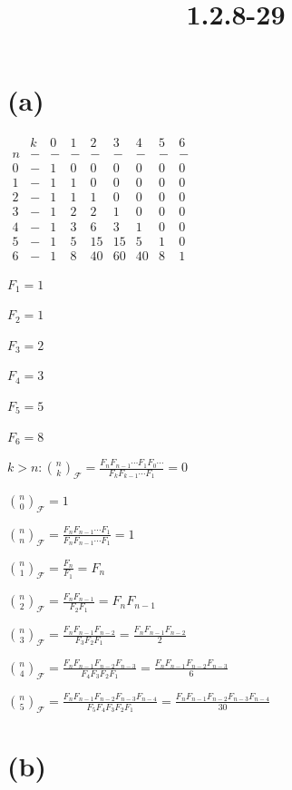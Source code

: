 \documentclass{article}
\title{1.2.8-29}
\begin{document}
\maketitle

\section*{(a)}

$\begin{matrix} & k & 0 & 1 & 2 & 3 & 4 & 5 & 6 \\ n & - & - & - & - & - & - & - & - \\ 0 & - & 1 & 0 & 0 & 0 & 0 & 0 & 0 \\ 1 & - & 1 & 1 & 0 & 0 & 0 & 0 & 0 \\ 2 & - & 1 & 1 & 1& 0 & 0 & 0 & 0 \\3 & - & 1 & 2 & 2 & 1 & 0 & 0 & 0 \\4 & - & 1 & 3 & 6 & 3 & 1 & 0 & 0 \\ 5 & - & 1 & 5 & 15 & 15 & 5 & 1 & 0 \\ 6 & - & 1 & 8 & 40 & 60 & 40 & 8 & 1 \end{matrix}$

$F_1 = 1$

$F_2 = 1$

$F_3 = 2$

$F_4 = 3$

$F_5 = 5$

$F_6 = 8$

$k > n: \binom{n}{k}_{\mathcal{F}} = \frac{F_nF_{n-1}\cdots F_1F_0\cdots}{F_kF_{k-1}\cdots F_1} = 0$

$\binom{n}{0}_{\mathcal{F}} = 1$

$\binom{n}{n}_{\mathcal{F}} = \frac{F_n F_{n-1} \cdots F_1}{F_n F_{n-1} \cdots F_1} = 1$

$\binom{n}{1}_{\mathcal{F}} = \frac{F_n}{F_1} = F_n$

$\binom{n}{2}_{\mathcal{F}} = \frac{F_nF_{n-1}}{F_2F_1} = F_nF_{n-1}$

$\binom{n}{3}_{\mathcal{F}} = \frac{F_nF_{n-1}F_{n-2}}{F_3F_2F_1} = \frac{F_nF_{n-1}F_{n-2}}{2}$

$\binom{n}{4}_{\mathcal{F}} = \frac{F_nF_{n-1}F_{n-2}F_{n-3}}{F_4F_3F_2F_1} = \frac{F_nF_{n-1}F_{n-2}F_{n-3}}{6}$

$\binom{n}{5}_{\mathcal{F}} = \frac{F_nF_{n-1}F_{n-2}F_{n-3}F_{n-4}}{F_5F_4F_3F_2F_1} = \frac{F_nF_{n-1}F_{n-2}F_{n-3}F_{n-4}}{30}$

\section*{(b)}
\end{document}
